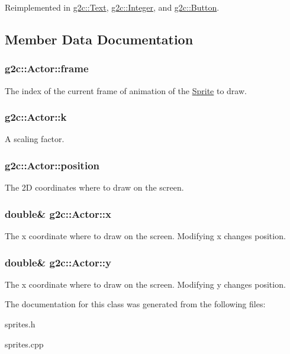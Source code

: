 Reimplemented in \hyperlink{classg2c_1_1_text_ab3296a30652c4c3157ae8a8e87449bb4}{g2c::Text}, \hyperlink{classg2c_1_1_integer_aac99d7502a55bf5db01f5d673779e36e}{g2c::Integer}, and \hyperlink{classg2c_1_1_button_a1d3bfdc06e37d9e533d1cd3b8d308579}{g2c::Button}.

\subsection{Member Data Documentation}
\hypertarget{classg2c_1_1_actor_a2b162d082f8f5e60463a4da42e9c58fd}{
\subsubsection[{frame}]{ {\bf g2c::Actor::frame}}}
\label{classg2c_1_1_actor_a2b162d082f8f5e60463a4da42e9c58fd}
The index of the current frame of animation of the \hyperlink{classg2c_1_1_sprite}{Sprite} to draw. \hypertarget{classg2c_1_1_actor_ab180e437af1643b93944397b5c1bc02f}{
\subsubsection[{k}]{ {\bf g2c::Actor::k}}}
\label{classg2c_1_1_actor_ab180e437af1643b93944397b5c1bc02f}
A scaling factor. \hypertarget{classg2c_1_1_actor_aa674ee18247cbd0c2b908beb8496b71f}{
\subsubsection[{position}]{ {\bf g2c::Actor::position}}}
\label{classg2c_1_1_actor_aa674ee18247cbd0c2b908beb8496b71f}
The 2D coordinates where to draw on the screen. \hypertarget{classg2c_1_1_actor_aebf317d39fb7bf28c061741bd927f81f}{
\subsubsection[{x}]{\setlength{\rightskip}{0pt plus 5cm}double\& {\bf g2c::Actor::x}}}
\label{classg2c_1_1_actor_aebf317d39fb7bf28c061741bd927f81f}
The x coordinate where to draw on the screen. Modifying x changes position. \hypertarget{classg2c_1_1_actor_ae627fd6cc00197b7e0a0b05d1d93b350}{
\subsubsection[{y}]{\setlength{\rightskip}{0pt plus 5cm}double\& {\bf g2c::Actor::y}}}
\label{classg2c_1_1_actor_ae627fd6cc00197b7e0a0b05d1d93b350}
The x coordinate where to draw on the screen. Modifying y changes position. 

The documentation for this class was generated from the following files:\begin{DoxyCompactItemize}
\item 
sprites.h\item 
sprites.cpp\end{DoxyCompactItemize}
